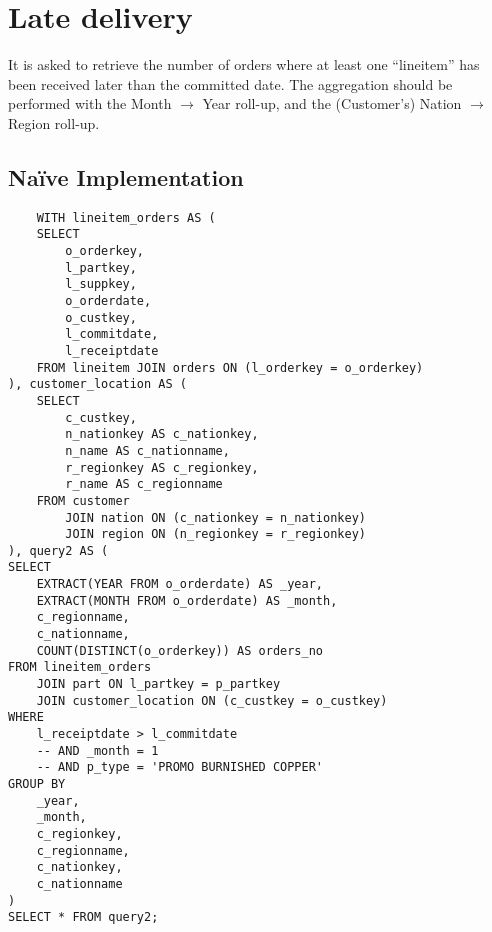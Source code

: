

\section{Late delivery}

It is asked to retrieve the number of orders where at least one ``lineitem'' has been received later than the committed date.
The aggregation should be performed with the Month $\rightarrow$ Year roll-up, and the (Customer's) Nation $\rightarrow$ Region roll-up.

\subsection{Na\"{i}ve Implementation}

\begin{lstlisting}
    WITH lineitem_orders AS (
	SELECT
		o_orderkey, 
		l_partkey, 
		l_suppkey, 
		o_orderdate, 
		o_custkey,
		l_commitdate,
		l_receiptdate
	FROM lineitem JOIN orders ON (l_orderkey = o_orderkey)
), customer_location AS (
	SELECT 
		c_custkey, 
		n_nationkey AS c_nationkey, 
		n_name AS c_nationname, 
		r_regionkey AS c_regionkey, 
		r_name AS c_regionname 
	FROM customer 
		JOIN nation ON (c_nationkey = n_nationkey)
		JOIN region ON (n_regionkey = r_regionkey)
), query2 AS (
SELECT 
	EXTRACT(YEAR FROM o_orderdate) AS _year,
	EXTRACT(MONTH FROM o_orderdate) AS _month,
	c_regionname,
	c_nationname,
	COUNT(DISTINCT(o_orderkey)) AS orders_no
FROM lineitem_orders
	JOIN part ON l_partkey = p_partkey
	JOIN customer_location ON (c_custkey = o_custkey)
WHERE 
	l_receiptdate > l_commitdate
	-- AND _month = 1
	-- AND p_type = 'PROMO BURNISHED COPPER'
GROUP BY
	_year,
	_month,
	c_regionkey,
	c_regionname,
	c_nationkey,
	c_nationname
)
SELECT * FROM query2;
\end{lstlisting}